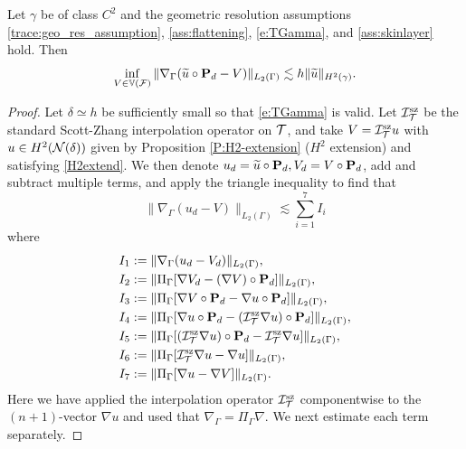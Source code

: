 \begin{lemma}
\label{lem:trace_approx}
Let $\gamma$ be of class $C^2$ and the geometric resolution assumptions \eqref{trace:geo_res_assumption}, \eqref{ass:flattening}, \eqref{e:TGamma}, and \eqref{ass:skinlayer} hold.  Then
%
\begin{equation}\label{e:trace_approx}
  \inf_{V \in \mathbb{V}(\mathcal F)} \|\nabla_\Gamma (\widetilde{u}\circ{\bf P}_d-V)\|_{L_2(\Gamma)}
  \lesssim h\|\widetilde{u}\|_{H^2(\gamma)}.
  \end{equation}
\end{lemma}
\begin{proof}
Let $\delta \simeq h$ be sufficiently small so that \eqref{e:TGamma} is valid.
Let $\mathcal{I}_{\mathcal{T}}^{\textrm{sz}}$ be the standard Scott-Zhang interpolation operator on $\mathcal{T}$, and take $V=\mathcal{I}_{\mathcal{T}}^{\textrm{sz}} u$ with $u\in H^2({\mathcal{N}(\delta)})$ given by Proposition \ref{P:H2-extension} ($H^2$ extension) and satisfying \eqref{H2extend}. We then denote $u_d=\widetilde{u}\circ{\bf P}_d, V_d=V\circ{\bf P}_d$, add and subtract multiple terms, and apply the triangle inequality to find that
%
\[
\| \nabla_\Gamma(u_d-V)\|_{L_2(\Gamma)}  \lesssim  \sum_{i=1}^7 I_i
\]
%
where
%
\begin{align*}
I_1 &:= \|\nabla_\Gamma(u_d-V_d)\|_{L_2(\Gamma)},
\\ I_2 &:=   \|\Pi_\Gamma [\nabla V_d-(\nabla V) \circ {\bf P}_d]\|_{L_2(\Gamma)} ,
\\ I_3 &:= \|\Pi_\Gamma [\nabla V\circ {\bf P}_d - \nabla u \circ {\bf P}_d]\|_{L_2(\Gamma)} ,
\\ I_4 &:= \|\Pi_\Gamma [\nabla u \circ {\bf P}_d - (\mathcal{I}_{\mathcal{T}}^{\textrm{sz}} \nabla u) \circ {\bf P}_d]\|_{L_2(\Gamma)},
\\ I_5 &:= \|\Pi_\Gamma [(\mathcal{I}_{\mathcal{T}}^{\textrm{sz}} \nabla u) \circ {\bf P}_d - \mathcal{I}_{\mathcal{T}}^{\textrm{sz}} \nabla u] \|_{L_2(\Gamma)} ,
\\ I_6 &:= \|\Pi_\Gamma [\mathcal{I}_{\mathcal{T}}^{\textrm{sz}} \nabla u - \nabla u]\|_{L_2(\Gamma)},
\\ I_7 &:= \|\Pi_\Gamma [ \nabla u -\nabla V]\|_{L_2(\Gamma)}.
\end{align*}
%
Here we have applied the interpolation operator $\mathcal{I}_{\mathcal{T}}^{\textrm{sz}}$ componentwise to the $(n+1)$-vector $\nabla u$ and used that $\nabla_\Gamma = \Pi_\Gamma \nabla$. We next estimate each term separately.


\end{proof}
